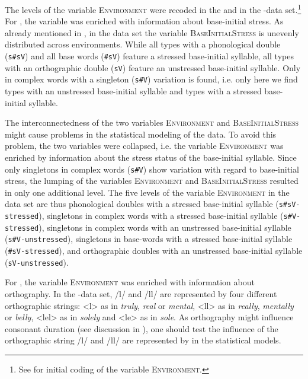 The levels of the variable \textsc{Environment} were recoded in the  and in the -data set.\footnote{See  for initial coding of the variable \textsc{Environment.}} 
 For , the variable was enriched with information about base-initial stress. 
 As already mentioned in , in the data set the variable \textsc{BaseInitialStress} is unevenly distributed across environments.  While all types with a phonological double (\texttt{s\#sV}) and all base words (\texttt{\#sV}) feature a stressed base-initial syllable, all types with an orthographic double (\texttt{sV}) feature an unstressed base-initial syllable. Only in complex words with a singleton (\texttt{s\#V}) variation is found, i.e. only here we find types with an unstressed base-initial syllable and types with a stressed base-initial syllable. 
 
 The interconnectedness of the two variables \textsc{Environment} and \textsc{BaseInitialStress} might cause problems in  the statistical modeling of the data. To avoid this problem, the two variables were collapsed, i.e. the variable \textsc{Environment} was enriched by information about the stress status of the base-initial syllable. Since only singletons in complex words (\texttt{s\#V}) show variation with regard to base-initial stress, the lumping of the variables \textsc{Environment} and \textsc{BaseInitialStress} resulted in only one additional level. 
 The five levels of the variable \textsc{Environment} in the data set are thus phonological doubles with a stressed base-initial syllable (\texttt{s\#sV-stressed}), singletons in complex words with a stressed base-initial syllable (\texttt{s\#V-stressed}), singletons in complex words with an unstressed base-initial syllable (\texttt{s\#V-unstressed}), singletons in base-words with a stressed base-initial syllable (\texttt{\#sV-stressed}), and orthographic doubles with an unstressed base-initial syllable (\texttt{sV-unstressed}).

 For , the variable \textsc{Environment} was enriched with information about orthography. 
In the -data set, /l/ and /ll/ are represented by four different orthographic strings:  <l> as in \textit{truly},  \textit{real} or \textit{mental}, <ll> as in \textit{really}, \textit{mentally} or \textit{belly}, <lel> as in \textit{solely} and <le> as in \textit{sole}. As orthography might influence consonant duration (see discussion in ), one should test the influence of the orthographic string /l/ and /ll/ are represented by in the statistical models.






